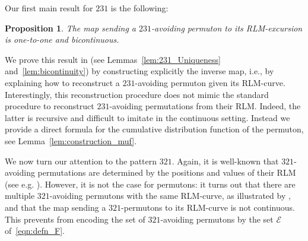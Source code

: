 \documentclass[a4paper,11pt]{amsart}
\newtheorem{prop}[thm]{Proposition}
\theoremstyle{definition}
\begin{document}

Our first main result for $231$ is the following:
\begin{prop}
\label{prop:intro-param231}
The map sending a $231$-avoiding permuton to its RLM-excursion is one-to-one and bicontinuous.
\end{prop}
We prove this result in  (see Lemmas~\ref{lem:231_Uniqueness} and~\ref{lem:bicontinuity}) by constructing explicitly the inverse map,
i.e., by explaining how to reconstruct a $231$-avoiding permuton given its RLM-curve.
Interestingly, this reconstruction procedure does not mimic the standard procedure
to reconstruct $231$-avoiding permutations from their RLM.
Indeed, the latter is recursive and difficult to imitate in the continuous setting.
Instead we provide a direct formula for the cumulative distribution function of the permuton,
see Lemma~\ref{lem:construction_muf}.
\medskip


We now turn our attention to the pattern $321$.
Again, it is well-known that $321$-avoiding permutations are determined by the positions and values of their
RLM (see e.g. \cite[Chapter 4]{BonaLivre}).
However, it is not the case for permutons: 
it turns out that there are multiple $321$-avoiding permutons with the same RLM-curve, as illustrated by , and that the map sending a $321$-permutons to its RLM-curve is not continuous. 
This prevents from encoding the set of $321$-avoiding permutons by the set $\mathcal E$ of~\eqref{eqn:defn_F}.
\end{document}
